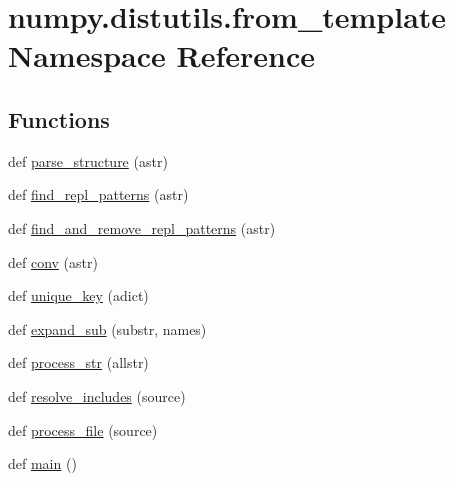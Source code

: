 \hypertarget{namespacenumpy_1_1distutils_1_1from__template}{}\section{numpy.\+distutils.\+from\+\_\+template Namespace Reference}
\label{namespacenumpy_1_1distutils_1_1from__template}
\subsection*{Functions}
\begin{DoxyCompactItemize}
\item 
def \hyperlink{namespacenumpy_1_1distutils_1_1from__template_a2ce2747a27983e7115264de6ce74fe93}{parse\+\_\+structure} (astr)
\item 
def \hyperlink{namespacenumpy_1_1distutils_1_1from__template_af0ea69227fe675c96e957bbf1145d695}{find\+\_\+repl\+\_\+patterns} (astr)
\item 
def \hyperlink{namespacenumpy_1_1distutils_1_1from__template_ad3e986d93a13f2505597d7c32b122c84}{find\+\_\+and\+\_\+remove\+\_\+repl\+\_\+patterns} (astr)
\item 
def \hyperlink{namespacenumpy_1_1distutils_1_1from__template_af368bcf90d70d5ee731188e634cce195}{conv} (astr)
\item 
def \hyperlink{namespacenumpy_1_1distutils_1_1from__template_ace62bb74290450c8db02c77489cbfbae}{unique\+\_\+key} (adict)
\item 
def \hyperlink{namespacenumpy_1_1distutils_1_1from__template_a6a541d2575d74c063769e3e3300e62e1}{expand\+\_\+sub} (substr, names)
\item 
def \hyperlink{namespacenumpy_1_1distutils_1_1from__template_a0b8e68dd1edd2ea1ed0851af62c87f99}{process\+\_\+str} (allstr)
\item 
def \hyperlink{namespacenumpy_1_1distutils_1_1from__template_a0faad6629020f4f1295d6c8bf5cade9a}{resolve\+\_\+includes} (source)
\item 
def \hyperlink{namespacenumpy_1_1distutils_1_1from__template_a922814a3711c667d5df366d7285c2953}{process\+\_\+file} (source)
\item 
def \hyperlink{namespacenumpy_1_1distutils_1_1from__template_a82a1daa52222f9751934648563d73af9}{main} ()
\end{DoxyCompactItemize}
